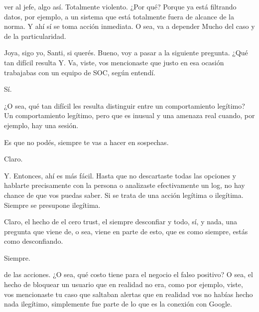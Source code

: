 \begin{description}[leftmargin=0cm, labelsep=0.5cm]
ver al jefe, algo así. Totalmente violento. ¿Por qué? Porque ya está filtrando datos, por ejemplo, a un sistema que está totalmente fuera de alcance de la norma. Y ahí sí se toma acción inmediata. O sea, va a depender Mucho del caso y de la particularidad.

    \item[\textbf{MUNTAABSKI FEDERICO:}] Joya, sigo yo, Santi, si querés. Bueno, voy a pasar a la siguiente pregunta. ¿Qué tan difícil resulta Y. Va, viste, vos mencionaste que justo en esa ocasión trabajabas con un equipo de SOC, según entendí.

    \item[\textbf{PEÑA ALEJANDRO FRANCISCO:}] Sí.

    \item[\textbf{MUNTAABSKI FEDERICO:}] ¿O sea, qué tan difícil les resulta distinguir entre un comportamiento legítimo? Un comportamiento legítimo, pero que es inusual y una amenaza real cuando, por ejemplo, hay una sesión.

    \item[\textbf{PEÑA ALEJANDRO FRANCISCO:}] Es que no podés, siempre te vas a hacer en sospechas.

    \item[\textbf{MUNTAABSKI FEDERICO:}] Claro.

    \item[\textbf{PEÑA ALEJANDRO FRANCISCO:}] Y. Entonces, ahí es más fácil. Hasta que no descartaste todas las opciones y hablarte precisamente con la persona o analizaste efectivamente un log, no hay chance de que vos puedas saber. Si se trata de una acción legítima o ilegítima. Siempre se presupone ilegítima.

    \item[\textbf{MUNTAABSKI FEDERICO:}] Claro, el hecho de el cero trust, el siempre desconfiar y todo, sí, y nada, una pregunta que viene de, o sea, viene en parte de esto, que es como siempre, estás como desconfiando.

    \item[\textbf{PEÑA ALEJANDRO FRANCISCO:}] Siempre.

    \item[\textbf{MUNTAABSKI FEDERICO:}] de las acciones. ¿O sea, qué costo tiene para el negocio el falso positivo? O sea, el hecho de bloquear un usuario que en realidad no era, como por ejemplo, viste, vos mencionaste tu caso que saltaban alertas que en realidad vos no habías hecho nada ilegítimo, simplemente fue parte de lo que es la conexión con Google.


\end{description}
